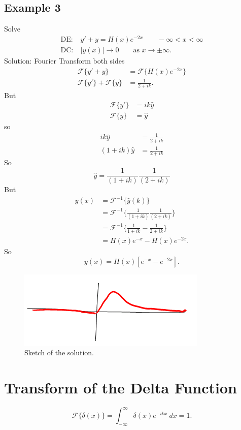\documentclass[cm]{article}
\newcommand{\yhat}{\hat{y}}
\begin{document}
\subsection{Example 3}
Solve
\begin{align*}
\text{DE:}&~y'+y = H(x)e^{-2x} \qquad - \infty < x < \infty \\
\text{DC:}&~|y(x)| \to 0 \qquad \text{as } x \to \pm \infty.
\end{align*}
Solution: Fourier Transform both sides
\begin{align*}
\mathscr F \{y' + y\} &= \mathscr F  \{ H(x) e^{-2x} \}\\
\mathscr F \{y'\} + \mathscr F \{y\} &= \frac{1}{2+ik}.
\end{align*}
But
\begin{align*}
\mathscr F \{y'\} &= ik \yhat \\
\mathscr F \{y\} &= \yhat
\end{align*}
so
\begin{align*}
ik\yhat &= \frac{1}{2+ik}\\
(1+ik)\yhat &= \frac{1}{2+ik}
\end{align*}
So
$$\yhat = \frac{1}{(1 + ik)}\frac{1}{(2+ik)}$$
But
\begin{align*}
y(x) &= \mathscr F^{-1} \{\yhat(k)\} \\
&= \mathscr F^{-1} \{\frac{1}{(1+ik)}\frac{1}{(2+ik)}\}\\
&= \mathscr F^{-1} \{\frac{1}{1+ik} - \frac{1}{2+ik}\} \\
&= H(x)e^{-x} - H(x)e^{-2x}.
\end{align*}
So
$$y(x) = H(x)[e^{-x}-e^{-2x}].$$ 
\begin{figure}
	\centering
		\includegraphics{10-28-2010-soln.png}
	\caption{Sketch of the solution.}
	\label{fig:soln}
\end{figure}

\section{Transform of the Delta Function}
$$\mathscr F \{\delta(x)\} = \int_{-\infty}^{\infty} \delta(x) e^{-ikx}~dx = 1.$$
\end{document}
